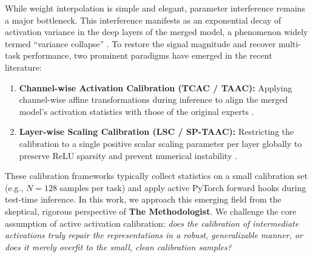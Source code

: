 \documentclass{article}
\begin{document}
While weight interpolation is simple and elegant, parameter interference remains a major bottleneck. This interference manifests as an exponential decay of activation variance in the deep layers of the merged model, a phenomenon widely termed ``variance collapse'' \cite{jordan2022repair, anonymous2026b_lsc}. To restore the signal magnitude and recover multi-task performance, two prominent paradigms have emerged in the recent literature:
\begin{enumerate}
    \item \textbf{Channel-wise Activation Calibration (TCAC / TAAC):} Applying channel-wise affine transformations during inference to align the merged model's activation statistics with those of the original experts \cite{anonymous2026c_tcac}.
    \item \textbf{Layer-wise Scaling Calibration (LSC / SP-TAAC):} Restricting the calibration to a single positive scalar scaling parameter per layer globally to preserve ReLU sparsity and prevent numerical instability \cite{anonymous2026a_sptaac, anonymous2026b_lsc}.
\end{enumerate}

These calibration frameworks typically collect statistics on a small calibration set (e.g., $N=128$ samples per task) and apply active PyTorch forward hooks during test-time inference. In this work, we approach this emerging field from the skeptical, rigorous perspective of \textbf{The Methodologist}. We challenge the core assumption of active activation calibration: \textit{does the calibration of intermediate activations truly repair the representations in a robust, generalizable manner, or does it merely overfit to the small, clean calibration samples?}
\end{document}
